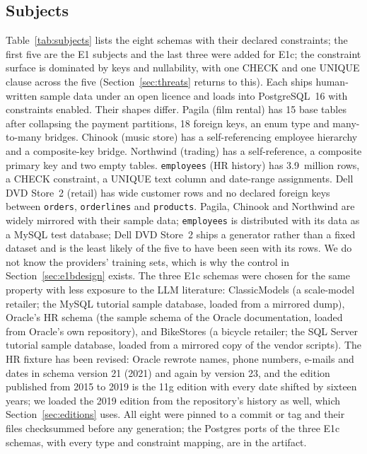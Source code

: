 \documentclass[preprint,12pt]{elsarticle}
\begin{document}
\subsection{Subjects}
Table~\ref{tab:subjects} lists the eight schemas with their declared constraints; the first five are the E1 subjects and the last three were added for E1c; the constraint surface is dominated by keys and nullability, with one CHECK and one UNIQUE clause across the five (Section~\ref{sec:threats} returns to this). Each ships human-written sample data under an open licence and loads into PostgreSQL~16 with constraints enabled. Their shapes differ. Pagila (film rental) has 15 base tables after collapsing the payment partitions, 18 foreign keys, an enum type and many-to-many bridges. Chinook (music store) has a self-referencing employee hierarchy and a composite-key bridge. Northwind (trading) has a self-reference, a composite primary key and two empty tables. \texttt{employees} (HR history) has 3.9~million rows, a CHECK constraint, a UNIQUE text column and date-range assignments. Dell DVD Store~2 (retail) has wide customer rows and no declared foreign keys between \texttt{orders}, \texttt{orderlines} and \texttt{products}. Pagila, Chinook and Northwind are widely mirrored with their sample data; \texttt{employees} is distributed with its data as a MySQL test database; Dell DVD Store~2 ships a generator rather than a fixed dataset and is the least likely of the five to have been seen with its rows. We do not know the providers' training sets, which is why the control in Section~\ref{sec:e1bdesign} exists. The three E1c schemas were chosen for the same property with less exposure to the LLM literature: ClassicModels (a scale-model retailer; the MySQL tutorial sample database, loaded from a mirrored dump), Oracle's HR schema (the sample schema of the Oracle documentation, loaded from Oracle's own repository), and BikeStores (a bicycle retailer; the SQL Server tutorial sample database, loaded from a mirrored copy of the vendor scripts). The HR fixture has been revised: Oracle rewrote names, phone numbers, e-mails and dates in schema version 21 (2021) and again by version 23, and the edition published from 2015 to 2019 is the 11g edition with every date shifted by sixteen years; we loaded the 2019 edition from the repository's history as well, which Section~\ref{sec:editions} uses. All eight were pinned to a commit or tag and their files checksummed before any generation; the Postgres ports of the three E1c schemas, with every type and constraint mapping, are in the artifact.
\end{document}
